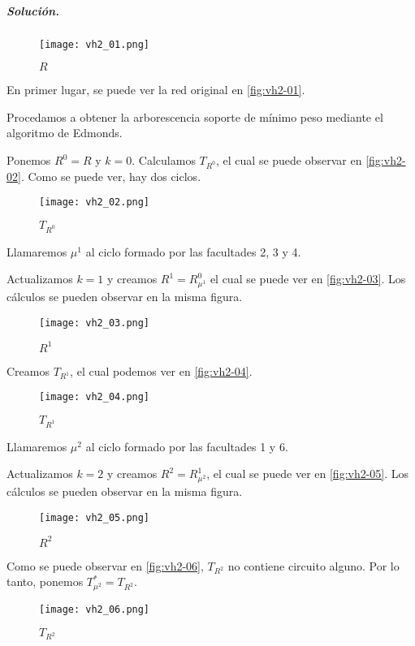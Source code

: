\documentclass[12pt, oneside, a4paper]{article}
\begin{document}
\subparagraph{Solución.\\}

\begin{figure}
\centering
\texttt{[image: vh2\_01.png]}
\caption{$R$}
\label{fig:vh2-01}
\end{figure}
En primer lugar, se puede ver la red original en \autoref{fig:vh2-01}.

Procedamos a obtener la arborescencia soporte de mínimo peso mediante
el algoritmo de Edmonds.

Ponemos $R^0=R$ y $k=0$. Calculamos $T_{R^0}$, el cual se puede
observar en \autoref{fig:vh2-02}. Como se puede ver, hay dos
ciclos.

\begin{figure}
\centering
\texttt{[image: vh2\_02.png]}
\caption{$T_{R^{0}}$}
\label{fig:vh2-02}
\end{figure}

Llamaremos $\mu^1$ al ciclo formado por las facultades 2, 3 y
4.

Actualizamos $k=1$ y creamos $R^1=R^0_{\mu^1}$ el cual se puede ver
en \autoref{fig:vh2-03}. Los cálculos se pueden observar en la misma
figura.

\begin{figure}
\centering
\texttt{[image: vh2\_03.png]}
\caption{$R^{1}$}
\label{fig:vh2-03}
\end{figure}

Creamos $T_{R^{1}}$, el cual podemos ver en \autoref{fig:vh2-04}.

\begin{figure}
\centering
\texttt{[image: vh2\_04.png]}
\caption{$T_{R^{1}}$}
\label{fig:vh2-04}
\end{figure}

Llamaremos $\mu^2$ al ciclo formado por las facultades 1 y 6.

Actualizamos $k=2$ y creamos $R^2=R^1_{\mu^2}$, el cual se puede ver
en \autoref{fig:vh2-05}. Los cálculos se pueden observar en la misma figura.

\begin{figure}
\centering
\texttt{[image: vh2\_05.png]}
\caption{$R^2$}
\label{fig:vh2-05}
\end{figure}

Como se puede observar en \autoref{fig:vh2-06}, $T_{R^{2}}$ no contiene
circuito alguno. Por lo tanto, ponemos $T^{*}_{\mu^{2}}=T_{R^{2}}$.

\begin{figure}
\centering
\texttt{[image: vh2\_06.png]}
\caption{$T_{R^2}$}
\label{fig:vh2-06}
\end{figure}
\end{document}
